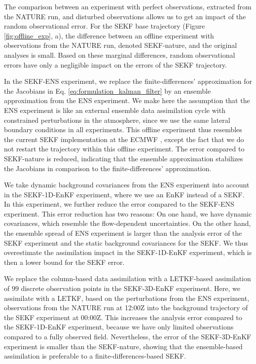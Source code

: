 \documentclass[HESSD, manuscript]{copernicus}
\begin{document}
The comparison between an experiment with perfect observations, extracted from the NATURE run, and disturbed observations allows us to get an impact of the random observational error.
For the SEKF base trajectory (Figure \ref{fig:offline_exp}, a), the difference between an offline experiment with observations from the NATURE run, denoted SEKF-nature, and the original analyses is small.
Based on these marginal differences, random observational errors have only a negligible impact on the errors of the SEKF trajectory.

In the SEKF-ENS experiment, we replace the finite-differences' approximation for the Jacobians in Eq. \eqref{eq:formulation_kalman_filter} by an ensemble approximation from the ENS experiment.
We make here the assumption that the ENS experiment is like an external ensemble data assimilation cycle with constrained perturbations in the atmosphere, since we use the same lateral boundary conditions in all experiments.
This offline experiment thus resembles the current SEKF implementation at the ECMWF \citep{ecmwf_ifs_2019}, except the fact that we do not restart the trajectory within this offline experiment.
The error compared to SEKF-nature is reduced, indicating that the ensemble approximation stabilizes the Jacobians in comparison to the finite-differences' approximation.

We take dynamic background covariances from the ENS experiment into account in the SEKF-1D-EnKF experiment, where we use an EnKF instead of a SEKF.
In this experiment, we further reduce the error compared to the SEKF-ENS experiment.
This error reduction has two reasons:
On one hand, we have dynamic covariances, which resemble the flow-dependent uncertainties.
On the other hand, the ensemble spread of ENS experiment is larger than the analysis error of the SEKF experiment and the static background covariances for the SEKF.
We thus overestimate the assimilation impact in the SEKF-1D-EnKF experiment, which is then a lower bound for the SEKF error.

We replace the column-based data assimilation with a LETKF-based assimilation of $99$ discrete observation points in the SEKF-3D-EnKF experiment.
Here, we assimilate with a LETKF, based on the perturbations from the ENS experiment, observations from the NATURE run at 12:00Z into the background trajectory of the SEKF experiment at 00:00Z.
This increases the analysis error compared to the SEKF-1D-EnKF experiment, because we have only limited observations compared to a fully observed field.
Nevertheless, the error of the SEKF-3D-EnKF experiment is smaller than the SEKF-nature, showing that the ensemble-based assimilation is preferable to a finite-differences-based SEKF.
\end{document}
